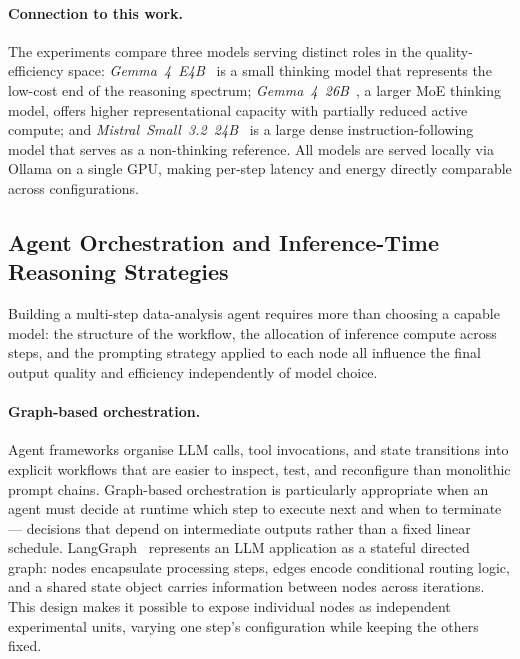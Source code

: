 \paragraph{Connection to this work.}
The experiments compare three models serving distinct roles in the
quality-efficiency space: \textit{Gemma~4~E4B}~\cite{gemma4_2025} is a small thinking model
that represents the low-cost end of the reasoning spectrum;
\textit{Gemma~4~26B}~\cite{gemma4_2025}, a larger MoE thinking model, offers
higher representational capacity with partially reduced active compute; and
\textit{Mistral~Small~3.2~24B}~\cite{mistralsmall_2025} is a large dense
instruction-following model that serves as a non-thinking reference.
All models are served locally via Ollama on a single GPU, making per-step
latency and energy directly comparable across configurations.

\subsection{Agent Orchestration and Inference-Time Reasoning Strategies}\label{sec:orchestration}

Building a multi-step data-analysis agent requires more than choosing a capable
model: the structure of the workflow, the allocation of inference compute across
steps, and the prompting strategy applied to each node all influence the final
output quality and efficiency independently of model choice.

\paragraph{Graph-based orchestration.}
Agent frameworks organise LLM calls, tool invocations, and state transitions
into explicit workflows that are easier to inspect, test, and reconfigure than
monolithic prompt chains.
Graph-based orchestration is particularly appropriate when an agent must decide
at runtime which step to execute next and when to terminate --- decisions that
depend on intermediate outputs rather than a fixed linear schedule.
LangGraph~\cite{langgraph} represents an LLM application as a stateful directed
graph: nodes encapsulate processing steps, edges encode conditional routing
logic, and a shared state object carries information between nodes across
iterations.
This design makes it possible to expose individual nodes as independent
experimental units, varying one step's configuration while keeping the
others fixed.

